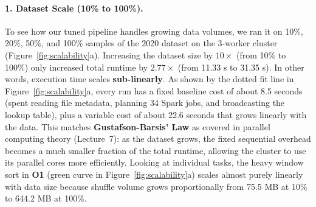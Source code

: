 \documentclass[sigconf,nonacm]{acmart}
\begin{document}
\paragraph{1. Dataset Scale (10\% to 100\%).}
To see how our tuned pipeline handles growing data volumes, we ran it on 10\%, 20\%, 50\%, and 100\% samples of the 2020 dataset on the 3-worker cluster (Figure~\ref{fig:scalability}a). Increasing the dataset size by $10\times$ (from 10\% to 100\%) only increased total runtime by \textbf{$2.77\times$} (from 11.33 s to 31.35 s). In other words, execution time scales \textbf{sub-linearly}. As shown by the dotted fit line in Figure~\ref{fig:scalability}a, every run has a fixed baseline cost of about 8.5 seconds (spent reading file metadata, planning 34 Spark jobs, and broadcasting the lookup table), plus a variable cost of about 22.6 seconds that grows linearly with the data. This matches \textbf{Gustafson-Barsis' Law} as covered in parallel computing theory (Lecture~7): as the dataset grows, the fixed sequential overhead becomes a much smaller fraction of the total runtime, allowing the cluster to use its parallel cores more efficiently. Looking at individual tasks, the heavy window sort in \textbf{O1} (green curve in Figure~\ref{fig:scalability}a) scales almost purely linearly with data size because shuffle volume grows proportionally from 75.5 MB at 10\% to 644.2 MB at 100\%.
\end{document}
